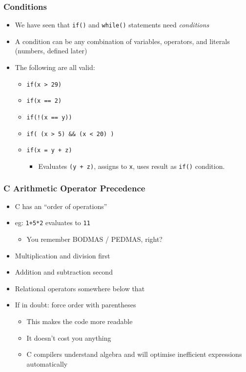 \documentclass[14pt]{beamer}
\begin{document}
\begin{frame}
\frametitle{Conditions}
\begin{itemize}
\item We have seen that \texttt{if()} and \texttt{while()} statements need \textit{conditions}
\item A condition can be any combination of variables, operators, and literals (numbers, defined later)
\item The following are all valid:
	\begin{itemize}
		\item \texttt{if(x > 29)}
		\item \texttt{if(x == 2)}
		\item \texttt{if(!(x == y))}
		\item \texttt{if( (x > 5) \&\& (x < 20) )}
		\item \texttt{if(x = y + z)}
			\begin{itemize}
				\item Evaluates \texttt{(y + z)}, assigns to \texttt{x}, uses result as \texttt{if()} condition.
			\end{itemize}
	\end{itemize}
\end{itemize}
\end{frame}

\begin{frame}
\frametitle{C Arithmetic Operator Precedence}
\begin{itemize}
\item C has an ``order of operations''
\item eg: \texttt{1+5*2} evaluates to \texttt{11}
	\begin{itemize}
		\item You remember BODMAS / PEDMAS, right?
	\end{itemize}
\item Multiplication and division first
\item Addition and subtraction second
\item Relational operators somewhere below that
\item If in doubt: force order with parentheses
	\begin{itemize}
		\item This makes the code more readable
		\item It doesn't cost you anything
		\item C compilers understand algebra and will optimise inefficient expressions automatically
	\end{itemize}

\end{itemize}
\end{frame}
\end{document}
